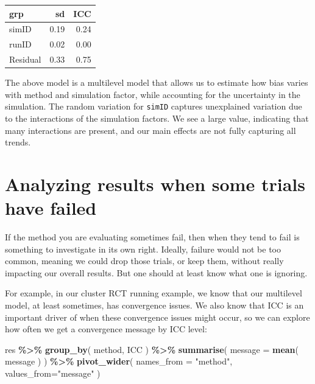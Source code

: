 \documentclass[
]{book}
\newenvironment{Shaded}{\begin{snugshade}}{\end{snugshade}}
\newcommand{\AttributeTok}[1]{\textcolor[rgb]{0.13,0.29,0.53}{#1}}
\newcommand{\FunctionTok}[1]{\textcolor[rgb]{0.13,0.29,0.53}{\textbf{#1}}}
\newcommand{\NormalTok}[1]{#1}
\newcommand{\SpecialCharTok}[1]{\textcolor[rgb]{0.81,0.36,0.00}{\textbf{#1}}}
\newcommand{\StringTok}[1]{\textcolor[rgb]{0.31,0.60,0.02}{#1}}
\begin{document}
\begin{tabular}{l|r|r}
\hline
grp & sd & ICC\\
\hline
simID & 0.19 & 0.24\\
\hline
runID & 0.02 & 0.00\\
\hline
Residual & 0.33 & 0.75\\
\hline
\end{tabular}

The above model is a multilevel model that allows us to estimate how bias varies with method and simulation factor, while accounting for the uncertainty in the simulation.
The random variation for \texttt{simID} captures unexplained variation due to the interactions of the simulation factors. We see a large value, indicating that many interactions are present, and our main effects are not fully capturing all trends.

\section{Analyzing results when some trials have failed}\label{analyzing-results-when-some-trials-have-failed}

If the method you are evaluating sometimes fail, then when they tend to fail is something to investigate in its own right.
Ideally, failure would not be too common, meaning we could drop those trials, or keep them, without really impacting our overall results.
But one should at least know what one is ignoring.

For example, in our cluster RCT running example, we know that our multilevel model, at least sometimes, has convergence issues.
We also know that ICC is an important driver of when these convergence issues might occur, so we can explore how often we get a convergence message by ICC level:

\begin{Shaded}
\begin{Highlighting}[]
\NormalTok{res }\SpecialCharTok{\%\textgreater{}\%} 
  \FunctionTok{group\_by}\NormalTok{( method, ICC ) }\SpecialCharTok{\%\textgreater{}\%}
  \FunctionTok{summarise}\NormalTok{( }\AttributeTok{message =} \FunctionTok{mean}\NormalTok{( message ) ) }\SpecialCharTok{\%\textgreater{}\%}
  \FunctionTok{pivot\_wider}\NormalTok{( }\AttributeTok{names\_from =} \StringTok{"method"}\NormalTok{, }\AttributeTok{values\_from=}\StringTok{"message"}\NormalTok{ )}
\end{Highlighting}
\end{Shaded}
\end{document}
